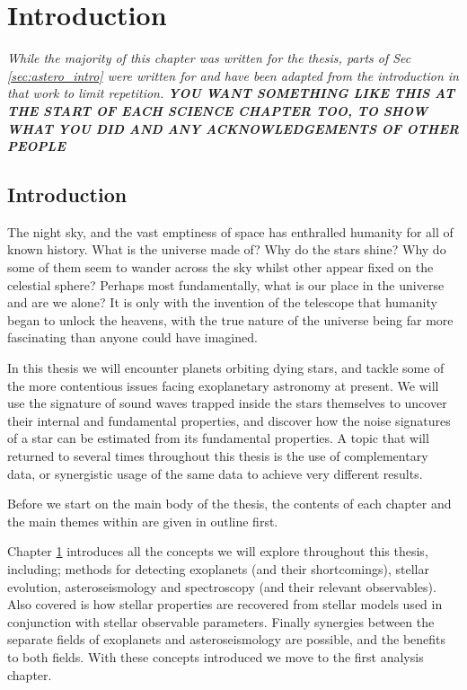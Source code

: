 \chapter{Introduction}\label{chap:intro}
\textit{While the majority of this chapter was written for the thesis, parts of Sec \ref{sec:astero_intro} were written for \cite{2017North} and have been adapted from the introduction in that work to limit repetition. \textbf{YOU WANT SOMETHING LIKE THIS AT THE START OF EACH SCIENCE CHAPTER TOO, TO SHOW WHAT YOU DID AND ANY ACKNOWLEDGEMENTS OF OTHER PEOPLE}}

\section{Introduction}
The night sky, and the vast emptiness of space has enthralled humanity for all of known history. What is the universe made of? Why do the stars shine? Why do some of them seem to wander across the sky whilst other appear fixed on the celestial sphere? Perhaps most fundamentally, what is our place in the universe and are we alone? It is only with the invention of the telescope that humanity began to unlock the heavens, with the true nature of the universe being far more fascinating than anyone could have imagined. 

In this thesis we will encounter planets orbiting dying stars, and tackle some of the more contentious issues facing exoplanetary astronomy at present. We will use the signature of sound waves trapped inside the stars themselves to uncover their internal and fundamental properties, and discover how the noise signatures of a star can be estimated from its fundamental properties. A topic that will returned to several times throughout this thesis is the use of complementary data, or synergistic usage of the same data to achieve very different results.

Before we start on the main body of the thesis, the contents of each chapter and the main themes within are given in outline first.

Chapter \ref{chap:intro} introduces all the concepts we will explore throughout this thesis, including; methods for detecting exoplanets (and their shortcomings), stellar evolution, asteroseismology and spectroscopy (and their relevant observables). Also covered is how stellar properties are recovered from stellar models used in conjunction with stellar observable parameters. Finally synergies between the separate fields of exoplanets and asteroseismology are possible, and the benefits to both fields. With these concepts introduced we move to the first analysis chapter.

